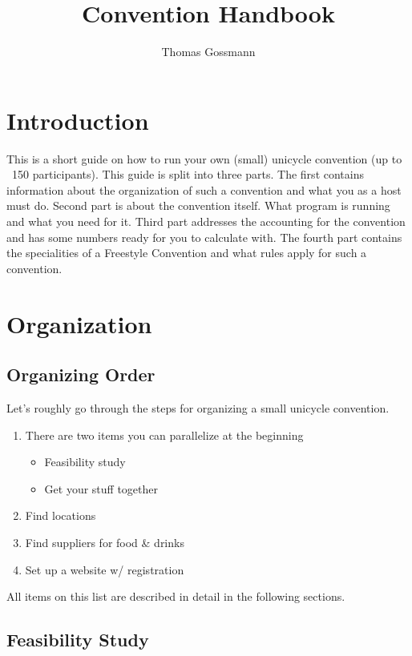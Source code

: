 \documentclass[11pt]{report}
\title{Convention Handbook}
\author{Thomas Gossmann}
\date{}
\begin{document}
\maketitle
\tableofcontents

\chapter{Introduction}

This is a short guide on how to run your own (small) unicycle convention (up to 
~150 participants). This guide is split into three parts. The first contains 
information about the organization of such a convention and what you as a host 
must do. Second part is about the convention itself. What program is running and 
what you need for it. Third part addresses the accounting for the convention and 
has some numbers ready for you to calculate with. The fourth part contains the 
specialities of a Freestyle Convention and what rules apply for such a 
convention.

\chapter{Organization}

\section{Organizing Order}

Let's roughly go through the steps for organizing a small unicycle convention.

\begin{enumerate}
	\item There are two items you can parallelize at the beginning
		\begin{itemize}
			\item Feasibility study
			\item Get your stuff together
		\end{itemize}
	\item Find locations
	\item Find suppliers for food & drinks
	\item Set up a website w/ registration
\end{enumerate}

All items on this list are described in detail in the following sections.

\section{Feasibility Study}
\end{document}
